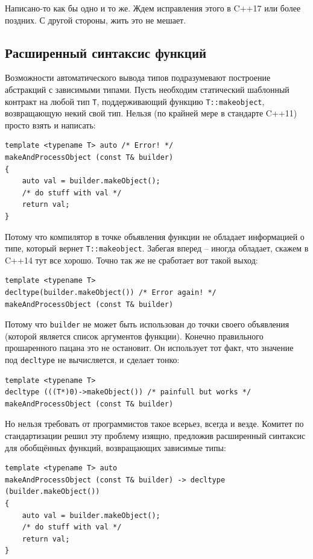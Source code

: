 \documentclass[a4paper,12pt,oneside]{book}
\begin{document}
Написано-то как бы одно и то же. Ждем исправления этого в C++17 или более поздних. С другой стороны, жить это не мешает.
\fi

\subsection{Расширенный синтаксис функций}\label{DeclFunctions}

Возможности автоматического вывода типов подразумевают построение абстракций с зависимыми типами. Пусть необходим статический шаблонный контракт на любой тип \lstinline!T!, поддерживающий функцию \lstinline!T::makeobject!, возвращающую некий свой тип. Нельзя (по крайней мере в стандарте C++11) просто взять и написать:

\begin{lstlisting}
template <typename T> auto /* Error! */
makeAndProcessObject (const T& builder)
{
    auto val = builder.makeObject();
    /* do stuff with val */
    return val;
}
\end{lstlisting}

Потому что компилятор в точке объявления функции не обладает информацией о типе, который вернет \lstinline!T::makeobject!. Забегая вперед -- иногда обладает, скажем в C++14 тут все хорошо. Точно так же не сработает вот такой выход:

\begin{lstlisting}
template <typename T> 
decltype(builder.makeObject()) /* Error again! */
makeAndProcessObject (const T& builder)
\end{lstlisting}

Потому что \lstinline!builder! не может быть использован до точки своего объявления (которой является список аргументов функции). Конечно правильного прошаренного пацана это не остановит. Он использует тот факт, что значение под \lstinline!decltype! не вычисляется, и сделает тонко:

\begin{lstlisting}
template <typename T> 
decltype (((T*)0)->makeObject()) /* painfull but works */
makeAndProcessObject (const T& builder)
\end{lstlisting}

Но нельзя требовать от программистов такое всерьез, всегда и везде. Комитет по стандартизации решил эту проблему изящно, предложив расширенный синтаксис для обобщённых функций, возвращающих зависимые типы:

\begin{lstlisting}
template <typename T> auto
makeAndProcessObject (const T& builder) -> decltype (builder.makeObject())
{
    auto val = builder.makeObject();
    /* do stuff with val */
    return val;
}
\end{lstlisting}
\end{document}
